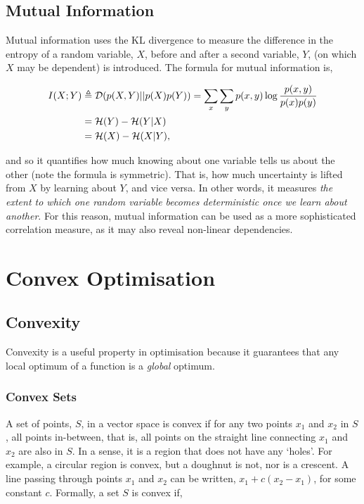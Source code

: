 \documentclass[11pt]{amsart}
\begin{document}
\subsection{Mutual Information}

Mutual information uses the KL divergence to measure the difference in the entropy of a random variable, $X$, before and after a second variable, $Y$, (on which $X$ may be dependent) is introduced. The formula for mutual information is,

\begin{align}
I(X; Y) &\triangleq \mathcal{D}(p(X, Y) || p(X)p(Y)) = \sum_x \sum_y p(x, y) \log\frac{p(x, y)}{p(x)p(y)}\notag \\
&= \mathcal{H}(Y) - \mathcal{H}(Y|X) \notag \\
&= \mathcal{H}(X) - \mathcal{H}(X|Y) \notag,
\end{align}

and so it quantifies how much knowing about one variable tells us about the other (note the formula is symmetric). That is, how much uncertainty is lifted from $X$ by learning about $Y$, and vice versa. In other words, it measures \emph{the extent to which one random variable becomes deterministic once we learn about another}. For this reason, mutual information can be used as a more sophisticated correlation measure, as it may also reveal non-linear dependencies.

\section{Convex Optimisation}
\subsection{Convexity}
Convexity is a useful property in optimisation because it guarantees that any local optimum of a function is a \emph{global} optimum.

\subsubsection{Convex Sets}
A set of points, $S$, in a vector space is convex if for any two points $x_1$ and $x_2$ in $S$, all points in-between, that is, all points on the straight line connecting $x_1$ and $x_2$ are also in $S$. In a sense, it is a region that does not have any `holes'. For example, a circular region is convex, but a doughnut is not, nor is a crescent. A line passing through points $x_1$ and $x_2$ can be written, $x_1 + c(x_2 - x_1)$, for some constant $c$. Formally, a set $S$ is convex if,
\end{document}
